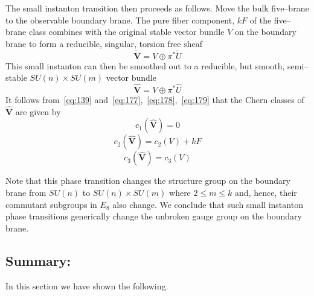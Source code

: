 \documentclass[a4paper,12pt]{article}
\numberwithin{equation}{section}
\newcommand{\bV}{{\mathbf V}}
\theoremstyle{plain}
\begin{document}
The small instanton transition then proceeds as follows. Move the bulk
five--brane to the observable boundary brane. The pure fiber component,
$kF$ of the five--brane class combines with the original stable
vector bundle $V$ on the boundary brane to form a reducible, singular, torsion
free sheaf 
\begin{equation}
\widetilde{\bV}= V \oplus \pi^{*}\tilde{U}
\label{eq:180}
\end{equation}
This small instanton can then be smoothed out to a reducible, but smooth,
semi--stable $SU(n) \times SU(m)$ vector bundle 
\begin{equation}
\widehat{\bV}= V \oplus \pi^{*}\hat{U}
\label{eq:181}
\end{equation}
It follows from~\eqref{eq:139}
and~\eqref{eq:177},~\eqref{eq:178},~\eqref{eq:179} that the Chern classes of
$\widehat{\bV}$ are given by
\begin{equation}
c_{1}(\widehat{\bV})=0
\label{eq:182}
\end{equation}
\begin{equation}
c_{2}(\widehat{\bV})=c_{2}(V)+kF
\label{eq:183}
\end{equation}
\begin{equation}
c_{3}(\widehat{\bV})=c_{3}(V)
\label{eq:184}
\end{equation}



Note that this phase transition changes the structure group on the boundary
brane from $SU(n)$ to $SU(n) \times SU(m)$
where $2 \leq m \leq k$ and, hence, their commutant subgroups in $E_{8}$ also
change. We conclude that such small instanton phase transitions
generically change the unbroken gauge group on the boundary brane.

\subsection*{Summary:}

In this section we have shown the following.
\end{document}
